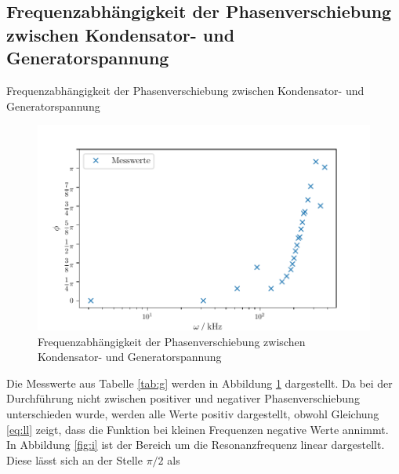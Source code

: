 \subsection{Frequenzabhängigkeit der Phasenverschiebung zwischen Kondensator- und Generatorspannung}

\begin{table}[H]
  \centering
  
  
  \caption{Frequenzabhängigkeit der Phasenverschiebung zwischen Kondensator- und Generatorspannung}
  \label{tab:g}
\end{table}

\begin{figure}[H]
  \centering
  \includegraphics{build/plot4.pdf}
  \caption{Frequenzabhängigkeit der Phasenverschiebung zwischen Kondensator- und Generatorspannung}
  \label{fig:j}
\end{figure}
\noindent Die Messwerte aus Tabelle \ref{tab:g} werden in Abbildung
\ref{fig:j} dargestellt. Da bei der Durchführung nicht zwischen
positiver und negativer Phasenverschiebung unterschieden wurde,
werden alle Werte positiv dargestellt, obwohl Gleichung \ref{eq:ll}
zeigt, dass die Funktion bei kleinen Frequenzen negative Werte annimmt.
In Abbildung \ref{fig:i} ist
der Bereich um die Resonanzfrequenz linear dargestellt.
Diese lässt sich an der Stelle $\pi/2$ als

